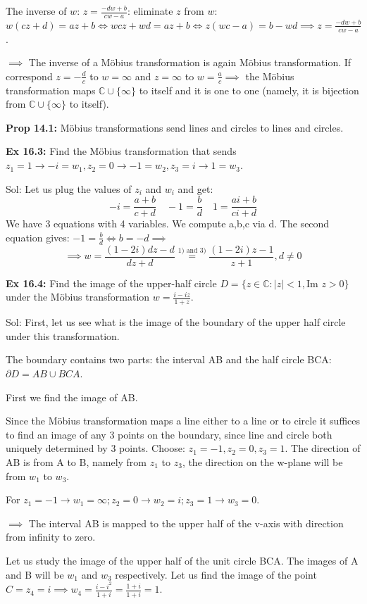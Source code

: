 \documentclass{article}
\begin{document}
The inverse of $w$: $z = \frac{-dw+b}{cw-a}$: eliminate $z$ from $w$: $w(cz+d) = az+b \iff wcz + wd = az + b \iff z(wc-a) = b - wd \implies z = \frac{-dw+b}{cw-a}$.

$\implies$ The inverse of a Möbius transformation is again Möbius transformation. If correspond $z = -\frac{d}{c}$ to $w = \infty$ and $z = \infty$ to $w = \frac{a}{c} \implies$ the Möbius transformation maps $\mathbb{C} \cup \{\infty\}$ to itself and it is one to one (namely, it is bijection from $\mathbb{C} \cup \{\infty\}$ to itself).

\textbf{Prop 14.1:} Möbius transformations send lines and circles to lines and circles.

\textbf{Ex 16.3:} Find the Möbius transformation that sends $z_1 = 1 \to -i = w_1, z_2 = 0 \to -1 = w_2, z_3 = i \to 1 = w_3$.

Sol: Let us plug the values of $z_i$ and $w_i$ and get:
$$ -i = \frac{a+b}{c+d} \quad -1 = \frac{b}{d} \quad 1 = \frac{ai+b}{ci+d} $$
We have 3 equations with 4 variables. We compute a,b,c via d. The second equation gives: $-1 = \frac{b}{d} \iff b = -d \implies$
$$ \implies w = \frac{(1-2i)dz - d}{dz + d} \overset{1) \text{ and } 3)}{=} \frac{(1-2i)z - 1}{z + 1}, d \neq 0 $$

\textbf{Ex 16.4:} Find the image of the upper-half circle $D = \{z \in \mathbb{C}: |z| < 1, \text{Im } z > 0\}$ under the Möbius transformation $w = \frac{i-iz}{1+z}$.

Sol: First, let us see what is the image of the boundary of the upper half circle under this transformation.

The boundary contains two parts: the interval AB and the half circle BCA: $\partial D = AB \cup BCA$.

First we find the image of AB.

Since the Möbius transformation maps a line either to a line or to circle it suffices to find an image of any 3 points on the boundary, since line and circle both uniquely determined by 3 points. Choose: $z_1 = -1, z_2 = 0, z_3 = 1$. The direction of AB is from A to B, namely from $z_1$ to $z_3$, the direction on the w-plane will be from $w_1$ to $w_3$.

For $z_1 = -1 \to w_1 = \infty; z_2 = 0 \to w_2 = i; z_3 = 1 \to w_3 = 0$.

$\implies$ The interval AB is mapped to the upper half of the v-axis with direction from infinity to zero.

Let us study the image of the upper half of the unit circle BCA. The images of A and B will be $w_1$ and $w_3$ respectively. Let us find the image of the point $C = z_4 = i \implies w_4 = \frac{i-i^2}{1+i} = \frac{1+i}{1+i} = 1$.
\end{document}
